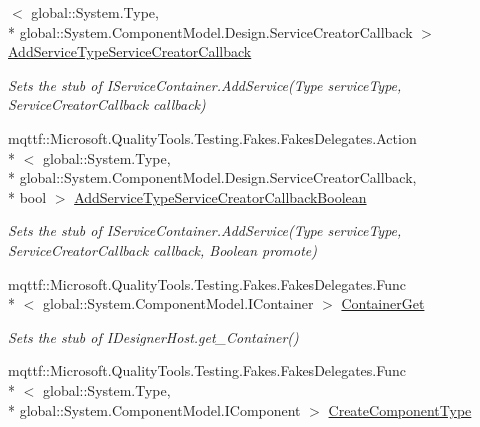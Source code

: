 \begin{DoxyCompactItemize}
$<$ global\-::\-System.\-Type, \\*
global\-::\-System.\-Component\-Model.\-Design.\-Service\-Creator\-Callback $>$ \hyperlink{class_system_1_1_component_model_1_1_design_1_1_serialization_1_1_fakes_1_1_stub_i_designer_loader_host_a60745d399479efc237ab18d28e497fe0}{Add\-Service\-Type\-Service\-Creator\-Callback}
\begin{DoxyCompactList}\small\item\em Sets the stub of I\-Service\-Container.\-Add\-Service(\-Type service\-Type, Service\-Creator\-Callback callback)\end{DoxyCompactList}\item 
mqttf\-::\-Microsoft.\-Quality\-Tools.\-Testing.\-Fakes.\-Fakes\-Delegates.\-Action\\*
$<$ global\-::\-System.\-Type, \\*
global\-::\-System.\-Component\-Model.\-Design.\-Service\-Creator\-Callback, \\*
bool $>$ \hyperlink{class_system_1_1_component_model_1_1_design_1_1_serialization_1_1_fakes_1_1_stub_i_designer_loader_host_ae5c35ef637e6ae2d1ca64cdf829d96b2}{Add\-Service\-Type\-Service\-Creator\-Callback\-Boolean}
\begin{DoxyCompactList}\small\item\em Sets the stub of I\-Service\-Container.\-Add\-Service(\-Type service\-Type, Service\-Creator\-Callback callback, Boolean promote)\end{DoxyCompactList}\item 
mqttf\-::\-Microsoft.\-Quality\-Tools.\-Testing.\-Fakes.\-Fakes\-Delegates.\-Func\\*
$<$ global\-::\-System.\-Component\-Model.\-I\-Container $>$ \hyperlink{class_system_1_1_component_model_1_1_design_1_1_serialization_1_1_fakes_1_1_stub_i_designer_loader_host_ab00a013110673c6e7d2a6868121a7f24}{Container\-Get}
\begin{DoxyCompactList}\small\item\em Sets the stub of I\-Designer\-Host.\-get\-\_\-\-Container()\end{DoxyCompactList}\item 
mqttf\-::\-Microsoft.\-Quality\-Tools.\-Testing.\-Fakes.\-Fakes\-Delegates.\-Func\\*
$<$ global\-::\-System.\-Type, \\*
global\-::\-System.\-Component\-Model.\-I\-Component $>$ \hyperlink{class_system_1_1_component_model_1_1_design_1_1_serialization_1_1_fakes_1_1_stub_i_designer_loader_host_ae2b9c9a9e35a0daacec01d0aefcb823a}{Create\-Component\-Type}

\end{DoxyCompactItemize}
